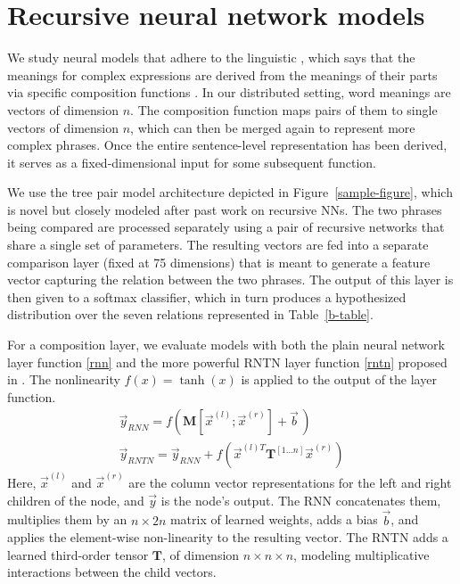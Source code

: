 
\section{Recursive neural network models} \label{methods}

We study neural models that adhere to the linguistic , which says that the meanings for complex
expressions are derived from the meanings of their parts
via specific composition functions \cite{Partee84,Janssen97}. In our
distributed setting, word meanings are vectors of dimension $n$. The
composition function maps pairs of them to single vectors of dimension $n$, 
which can then be merged again to represent more complex
phrases. Once the entire sentence-level representation has been
derived, it serves as a fixed-dimensional input for some subsequent function.

We use the tree pair model architecture depicted in Figure~\ref{sample-figure}, which is novel 
but closely modeled after past work on recursive NNs. 
The two phrases being compared are processed separately using a pair 
of recursive networks that share a single set of parameters. 
The resulting vectors are fed into a separate comparison
layer (fixed at 75 dimensions) that is meant to generate a feature vector capturing the
relation between the two phrases. The output of this layer is then
given to a softmax classifier, which in turn produces a hypothesized
distribution over the seven relations represented in Table~\ref{b-table}.

For a composition layer, we evaluate models with both the plain neural
network layer function \eqref{rnn} and the more powerful RNTN layer function
\eqref{rntn} proposed in . The nonlinearity $f(x) = \tanh(x)$ is applied to the output of the layer function.
%
\begin{gather} \label{rnn}
\vec{y}_{\textit{RNN}} = f(\mathbf{M} [\vec{x}^{(l)}; \vec{x}^{(r)}] + \vec{b}\,) \\
\label{rntn}
\vec{y}_{\textit{RNTN}} = \vec{y}_{\textit{RNN}} + f(\vec{x}^{(l)T} \mathbf{T}^{[1 \ldots n]} \vec{x}^{(r)})
\end{gather} 
%
Here, $\vec{x}^{(l)}$ and $\vec{x}^{(r)}$ are the column vector
representations for the left and right children of the node, and
$\vec{y}$ is the node's output.  The RNN concatenates them, multiplies
them by an $n \times 2n$ matrix of learned weights, adds a bias $\vec{b}$, and applies the
element-wise non-linearity to the resulting vector. The RNTN adds a learned third-order tensor 
$\mathbf{T}$, of dimension $n \times n \times n$, modeling
multiplicative interactions between the child vectors.

